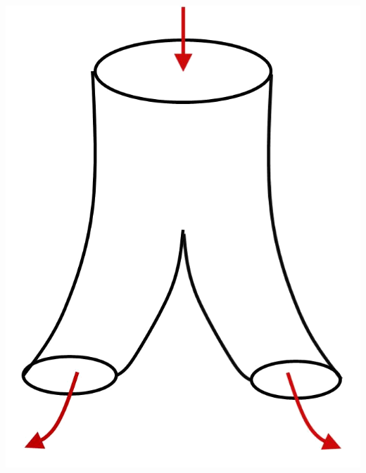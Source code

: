 \documentclass[a4paper,11pt,notitlepage]{report}
\theoremstyle{definition}
\begin{document}
\includegraphics[scale=0.4]{images/Stringtheorie.png}
\end{document}
